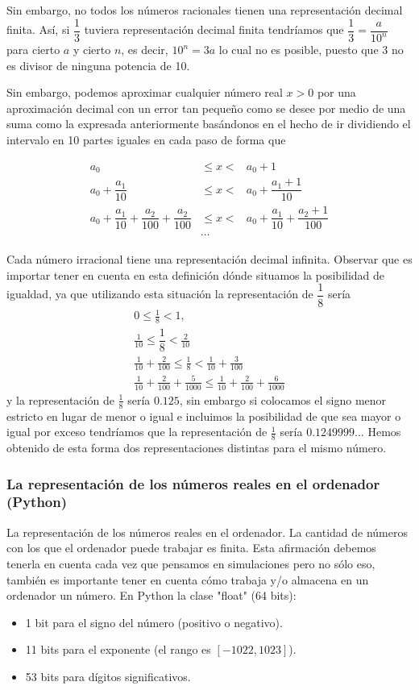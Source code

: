\documentclass[12pt]{article}
\begin{document}
Sin embargo, no todos los números racionales tienen una representación decimal finita. Así, si $\dfrac{1}{3}$ tuviera representación decimal finita tendríamos que $\dfrac{1}{3}=\dfrac{a}{10^n}$ para cierto $a$ y cierto $n$, es decir, $10^n=3a$ lo cual no es posible, puesto que 3 no es divisor de ninguna potencia de 10.

Sin embargo, podemos aproximar cualquier número real $x>0$ por una aproximación decimal con un error tan pequeño como se desee por medio de una suma como la expresada anteriormente basándonos en el hecho de ir dividiendo el intervalo en 10 partes iguales en cada paso de forma que 

\[\begin{array}{rcl}
	a_0&\le x<&a_0+1 \\
	a_0+\dfrac{a_1}{10}&\le x<&a_0+\dfrac{a_1+1}{10}\\
	a_0+\dfrac{a_1}{10}+\dfrac{a_2}{100}+\dfrac{a_2}{100}&\le x<&a_0+\dfrac{a_1}{10}+\dfrac{a_2+1}{100}\\
	&\cdots&
\end{array}\]

Cada número irracional tiene una representación decimal infinita. Observar que es importar tener en cuenta en esta definición dónde situamos la posibilidad de igualdad, ya que utilizando esta situación la representación de $\dfrac{1}{8}$ sería \[ \begin{array}{c}
	0\le\frac{1}{8}<1,\\
	\frac{1}{10}\le \dfrac{1}{8}<\frac{2}{10}\\
	\frac{1}{10}+\frac{2}{100}\le\frac{1}{8}<\frac{1}{10}+\frac{3}{100}\\
	\frac{1}{10}+\frac{2}{100}+\frac{5}{1000}\le\frac{1}{10}+\frac{2}{100}+\frac{6}{1000}
\end{array} \] y la representación de $\frac{1}{8}$ sería $0.125$, sin embargo si colocamos el signo menor estricto en lugar de menor o igual e incluimos la posibilidad de que sea mayor o igual por exceso tendríamos que la representación de $\frac{1}{8}$ sería $ 0.1249999\hdots$  Hemos obtenido de esta forma dos representaciones distintas para el mismo número.

\subsubsection{La representación de los números reales en el ordenador (Python)}
La representación de los números reales en el ordenador. La cantidad de números con los que el ordenador puede trabajar es finita. Esta afirmación debemos tenerla en cuenta cada vez que pensamos en simulaciones pero no sólo eso, también es importante tener en cuenta cómo trabaja y/o almacena en un ordenador un número.
 En Python la clase "float" (64 bits):
 \begin{itemize}
 	\item 1 bit para el signo del número (positivo o negativo).
 	\item  11 bits para el exponente (el rango es $[-1022, 1023]$).
 	\item 53 bits para dígitos significativos.
 \end{itemize}
\end{document}
